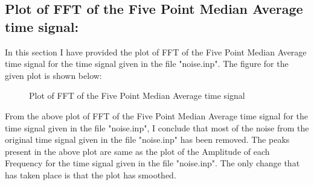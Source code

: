 \documentclass[12pt,a4paper]{article}
\begin{document}
\subsection{Plot of FFT of the Five Point Median Average time signal:}
In this section I have provided the plot of FFT of the Five Point Median Average time signal for the time signal given in the file "noise.inp". The figure for the given plot is shown below:
\begin{figure}[!ht]
	\begin{center}
	\end{center}
	\caption{Plot of FFT of the Five Point Median Average time signal}
\end{figure}
\clearpage
\noindent
From the above plot of FFT of the Five Point Median Average time signal for the time signal given in the file "noise.inp", I conclude that most of the noise from the original time signal given in the file "noise.inp" has been removed. The peaks present in the above plot are same as the plot of the Amplitude of each Frequency for the time signal given in the file "noise.inp". The only change that has taken place is that the plot has smoothed.
\end{document}
